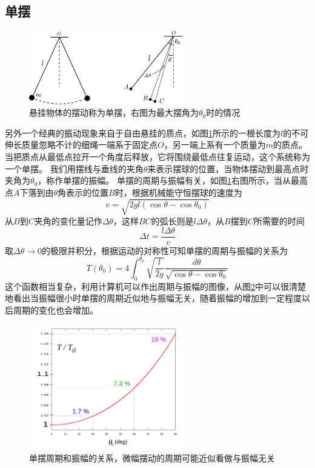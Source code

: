 \subsection{单摆}
\begin{figure}[hbtp]
\centering
\includegraphics[width=0.6\textwidth]{images/ow-pendulum.pdf}
\caption{悬挂物体的摆动称为单摆，右图为最大摆角为$\theta_0$时的情况}\label{fig: ow-单摆}
\end{figure}
另外一个经典的振动现象来自于自由悬挂的质点，如图\ref{fig: ow-单摆}所示的一根长度为$l$的不可伸长质量忽略不计的细绳一端系于固定点$O$，另一端上系有一个质量为$m$的质点。
当把质点从最低点拉开一个角度后释放，它将围绕最低点往复运动，这个系统称为一个单摆。
我们用摆线与垂线的夹角$\theta$来表示摆球的位置，当物体摆动到最高点时夹角为$\theta_0$，称作单摆的振幅。
单摆的周期与振幅有关，如图\ref{fig: ow-单摆}右图所示，当从最高点$A$下落到由$\theta$角表示的位置$B$时，根据机械能守恒摆球的速度为
\begin{equation}
v = \sqrt{2gl(\cos\theta-\cos\theta_0)}
\end{equation}
从$B$到$C$夹角的变化量记作$\Delta \theta$，这样$BC$的弧长则是$l\Delta \theta$，从$B$摆到$C$所需要的时间
\begin{equation}
\Delta t = \frac{l\Delta\theta}{v}
\end{equation}
取$\Delta\theta\rightarrow 0$的极限并积分，根据运动的对称性可知单摆的周期与振幅的关系为
\begin{equation}
T(\theta_0)= 4\int_0^{\theta_0}\sqrt{\frac{l}{2g}}\frac{d\theta}{\sqrt{\cos\theta-\cos\theta_0}}
\end{equation}
这个函数相当复杂，利用计算机可以作出周期与振幅的图像，从图\ref{fig: ow-单摆的周期和振幅的关系}中可以很清楚地看出当振幅很小时单摆的周期近似地与振幅无关，随着振幅的增加到一定程度以后周期的变化也会增加。

\begin{figure}[hbtp]
\centering
\includegraphics[width=0.6\textwidth]{images/ow-Pendulum_period.pdf}
\caption{单摆周期和振幅的关系，微幅摆动的周期可能近似看做与振幅无关}\label{fig: ow-单摆的周期和振幅的关系}
\end{figure}



